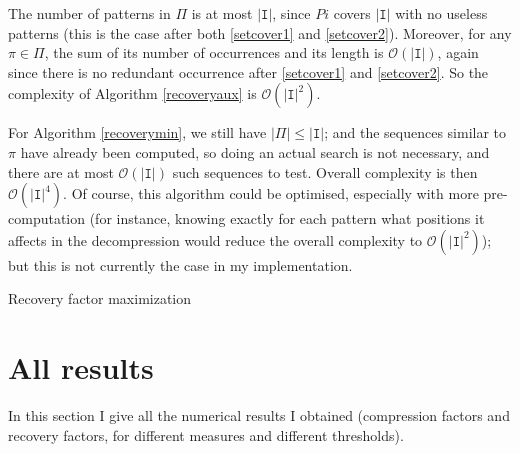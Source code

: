 \documentclass[a4paper,10pt]{article}
\newcommand{\bigO}[1]{\mathcal O\left( #1 \right)}
\begin{document}
The number of patterns in $\Pi$ is at most $|\texttt{I}|$, since $Pi$ covers $|\texttt{I}|$ with no useless patterns (this is the case after both \ref{setcover1} and \ref{setcover2}). Moreover, for any $\pi\in\Pi$, the sum of its number of occurrences and its length is $\bigO{|\texttt{I}|}$, again since there is no redundant occurrence after \ref{setcover1} and \ref{setcover2}. So the complexity of Algorithm \ref{recoveryaux} is $\bigO{|\texttt{I}|^2}$.

For Algorithm \ref{recoverymin}, we still have $|\Pi|\leq|\texttt{I}|$; and the sequences similar to $\pi$ have already been computed, so doing an actual search is not necessary, and there are at most $\bigO{|\texttt{I}|}$ such sequences to test. Overall complexity is then $\bigO{|\texttt{I}|^4}$. Of course, this algorithm could be optimised, especially with more pre-computation (for instance, knowing exactly for each pattern what positions it affects in the decompression would reduce the overall complexity to $\bigO{|\texttt{I}|^2}$); but this is not currently the case in my implementation.

\begin{algorithm}
\caption{Recovery factor maximization \label{recoverymin}}
 
     
  


\end{algorithm}

\clearpage

\section{All results}

In this section I give all the numerical results I obtained (compression factors and recovery factors, for different measures and different thresholds).
\end{document}
